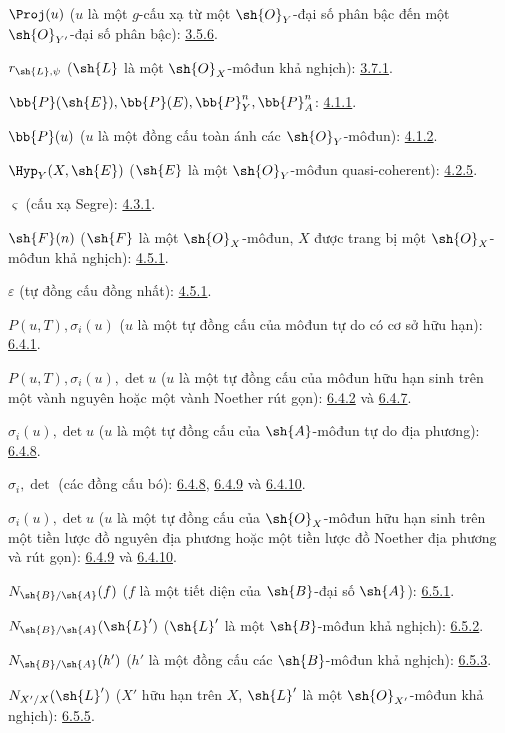 \documentclass[oneside,10pt]{amsart}
\begin{document}
$\Proj(u)$ ($u$ là một $g$-cấu xạ từ một $\sh{O}_Y$-đại số phân bậc
đến một $\sh{O}_{Y'}$-đại số phân bậc): \hyperref[II.3.5.6]{3.5.6}.

$r_{\sh{L},\psi}$ ($\sh{L}$ là một $\sh{O}_X$-môđun khả nghịch): \hyperref[II.3.7.1]{3.7.1}.

$\bb{P}(\sh{E}),\bb{P}(E),\bb{P}_Y^n,\bb{P}_A^n$: \hyperref[II.4.1.1]{4.1.1}.

$\bb{P}(u)$ ($u$ là một đồng cấu toàn ánh các $\sh{O}_Y$-môđun): \hyperref[II.4.1.2]{4.1.2}.

$\Hyp_Y(X,\sh{E})$ ($\sh{E}$ là một $\sh{O}_Y$-môđun quasi-coherent): \hyperref[II.4.2.5]{4.2.5}.

$\varsigma$ (cấu xạ Segre): \hyperref[II.4.3.1]{4.3.1}.

$\sh{F}(n)$ ($\sh{F}$ là một $\sh{O}_X$-môđun, $X$ được trang bị một
$\sh{O}_X$-môđun khả nghịch): \hyperref[II.4.5.1]{4.5.1}.

$\varepsilon$ (tự đồng cấu đồng nhất): \hyperref[II.4.5.1]{4.5.1}.

$P(u,T),\sigma_i(u)$ ($u$ là một tự đồng cấu của môđun tự do có cơ sở hữu hạn): \hyperref[II.6.4.1]{6.4.1}.

$P(u,T),\sigma_i(u),\det u$
($u$ là một tự đồng cấu của môđun hữu hạn sinh trên một vành nguyên hoặc một
vành Noether rút gọn): \hyperref[II.6.4.2]{6.4.2} và \hyperref[II.6.4.7]{6.4.7}.

$\sigma_i(u),\det u$ ($u$ là một tự đồng cấu của $\sh{A}$-môđun tự do địa phương): \hyperref[II.6.4.8]{6.4.8}.

$\sigma_i,\det$ (các đồng cấu bó): \hyperref[II.6.4.8]{6.4.8}, \hyperref[II.6.4.9]{6.4.9} và \hyperref[II.6.4.10]{6.4.10}.

$\sigma_i(u),\det u$
($u$ là một tự đồng cấu của $\sh{O}_X$-môđun hữu hạn sinh trên một tiền lược đồ
nguyên địa phương hoặc một tiền lược đồ Noether địa phương và rút gọn):
\hyperref[II.6.4.9]{6.4.9} và \hyperref[II.6.4.10]{6.4.10}.

$N_{\sh{B}/\sh{A}}(f)$
($f$ là một tiết diện của $\sh{B}$-đại số $\sh{A}$): \hyperref[II.6.5.1]{6.5.1}.

$N_{\sh{B}/\sh{A}}(\sh{L}')$
($\sh{L}'$ là một $\sh{B}$-môđun khả nghịch): \hyperref[II.6.5.2]{6.5.2}.

$N_{\sh{B}/\sh{A}}(h')$
($h'$ là một đồng cấu các $\sh{B}$-môđun khả nghịch): \hyperref[II.6.5.3]{6.5.3}.

$N_{X'/X}(\sh{L}')$
($X'$ hữu hạn trên $X$, $\sh{L}'$ là một $\sh{O}_{X'}$-môđun khả nghịch): \hyperref[II.6.5.5]{6.5.5}.
\end{document}
